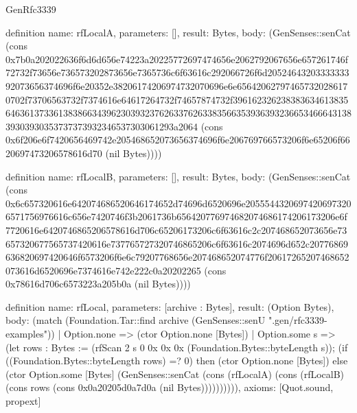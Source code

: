 \begin{lexlean}{GenRfc3339}
\begin{semanticmodule}
definition{
  name: rfLocalA,
  parameters: [],
  result: Bytes,
  body: (GenSenses::senCat (cons 0x7b0a202022636f6d6d656e74223a20225772697474656e2062792067656e657261746f72732f73656e736573202873656e7365736c6f63616c292066726f6d2052464320333333392073656374696f6e20352e38206174206974732070696e6e656420627974657320286170702f73706563732f7374616e64617264732f74657874732f39616232623838363461383564636137336138386634396230393237626337626338356635393639323665346664313839303930353737373932346537303061293a2064 (cons 0x6f206e6f7420656469742e205468652073656374696f6e206769766573206f6e65206f6620697473206578616d70 (nil Bytes))))
}

definition{
  name: rfLocalB,
  parameters: [],
  result: Bytes,
  body: (GenSenses::senCat (cons 0x6c657320616e642074686520646174652d74696d6520696e20555443206974206973206571756976616c656e7420746f3b2061736b656420776974682074686174206173206e6f7720616e6420746865206578616d706c65206173206c6f63616c2c207468652073656e73657320677565737420616e737765727320746865206c6f63616c2074696d652c20776869636820697420646f6573206f6e6c79207768656e207468652074776f20617265207468652073616d6520696e7374616e742e222c0a20202265 (cons 0x78616d706c6573223a205b0a (nil Bytes))))
}

definition{
  name: rfLocal,
  parameters: [archive : Bytes],
  result: (Option Bytes),
  body: (match (Foundation.Tar::find archive (GenSenses::senU ".gen/rfc3339-examples"))
    | Option.none => (ctor Option.none [Bytes])
    | Option.some s => (let rows : Bytes := (rfScan 2 s 0 0x 0x 0x (Foundation.Bytes::byteLength s)); (if ((Foundation.Bytes::byteLength rows) =? 0) then (ctor Option.none [Bytes]) else (ctor Option.some [Bytes] (GenSenses::senCat (cons (rfLocalA) (cons (rfLocalB) (cons rows (cons 0x0a20205d0a7d0a (nil Bytes)))))))))),
  axioms: [Quot.sound, propext]
}
\end{semanticmodule}
\end{lexlean}
